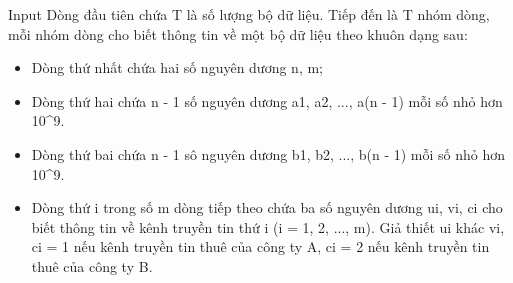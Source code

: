 Input
Dòng đầu tiên chứa T là số lượng bộ dữ liệu. Tiếp đến là T nhóm dòng, mỗi nhóm dòng cho biết thông tin về một bộ dữ liệu theo khuôn dạng sau:
\begin{itemize}
	\item Dòng thứ nhất chứa hai số nguyên dương n, m;
	\item Dòng thứ hai chứa n - 1 số nguyên dương a1, a2, ..., a(n - 1) mỗi số nhỏ hơn 10^9.
	\item Dòng thứ bai chứa n - 1 sô nguyên dương b1, b2, ..., b(n - 1) mỗi số nhỏ hơn 10^9.
	\item Dòng thứ i trong số m dòng tiếp theo chứa ba số nguyên dương ui, vi, ci cho biết thông tin về kênh truyền tin thứ i (i = 1, 2, ..., m). Giả thiết ui khác vi, ci = 1 nếu kênh truyền tin thuê của công ty A, ci = 2 nếu kênh truyền tin thuê của công ty B.
\end{itemize}